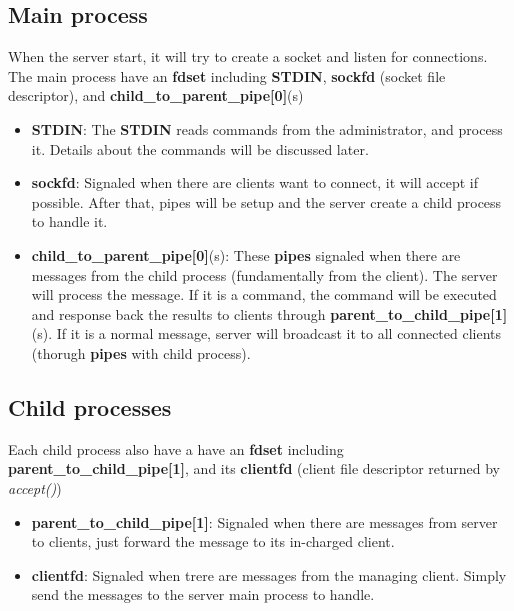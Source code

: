 \documentclass[12pt]{article}
\begin{document}
\subsection{Main process}

When the server start, it will try to create a socket and listen for connections. The main process have an \textbf{fdset} including \textbf{STDIN}, \textbf{sockfd} (socket file descriptor), and \textbf{child\_to\_parent\_pipe[0]}(s)

\begin{itemize}
\item \textbf{STDIN}: The \textbf{STDIN} reads commands from the administrator, and process it. Details about the commands will be discussed later.

\item \textbf{sockfd}: Signaled when there are clients want to connect, it will accept if possible. After that, pipes will be setup and the server create a child process to handle it.

\item \textbf{child\_to\_parent\_pipe[0]}(s): These \textbf{pipes} signaled when there are messages from the child process (fundamentally from the client). The server will process the message. If it is a command, the command will be executed and response back the results to clients through \textbf{parent\_to\_child\_pipe[1]}(s). If it is a normal message, server will broadcast it to all connected clients (thorugh \textbf{pipes} with child process).
\end{itemize}

\subsection{Child processes}

Each child process also have a have an \textbf{fdset} including \textbf{parent\_to\_child\_pipe[1]}, and its \textbf{clientfd} (client file descriptor returned by \textit{accept()})

\begin{itemize}
\item \textbf{parent\_to\_child\_pipe[1]}: Signaled when there are messages from server to clients, just forward the message to its in-charged client.

\item \textbf{clientfd}: Signaled when trere are messages from the managing client. Simply send the messages to the server main process to handle.
\end{itemize}
\end{document}

